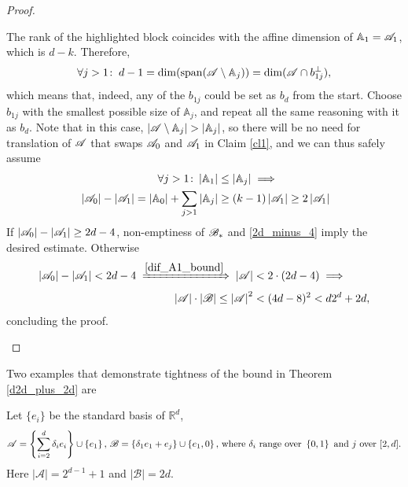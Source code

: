 \begin{proof}
\begin{enumerate}
            The rank of the highlighted block coincides with the affine dimension of $\mathbb{A}_1={\mathscr{A}}_1$, which is $d-k$. Therefore,
            \begin{equation*}
                \forall j>1\!:\;d-1=\operatorname{dim}(\operatorname{span}({\mathscr{A}}\setminus\mathbb{A}_j))=\operatorname{dim}({\mathscr{A}}\cap b_{1j}^\bot),
            \end{equation*}
            which means that, indeed, any of the $b_{1j}$ could be set as $b_d$ from the start. Choose $b_{1j}$ with the smallest possible size of $\mathbb{A}_j$, and repeat all the same reasoning with it as $b_d$. Note that in this case, $\left|\aaa\setminus\mathbb{A}_j\right|>\left|\mathbb{A}_j\right|$, so there will be no need for translation of ${\mathscr{A}}$ that swaps ${\mathscr{A}}_0$ and ${\mathscr{A}}_1$ in Claim \ref{cl1}, and we can thus safely assume
            \begin{align}
                \forall j>1\!:\:\left|\mathbb{A}_1\right| & \leq \left|\mathbb{A}_j\right|\; \Longrightarrow \nonumber\\
                 \;\left|{\mathscr{A}}_0\right|-\left|{\mathscr{A}}_1\right|=\left|\mathbb{A}_0\right|+\sum_{j>1}\left|\mathbb{A}_j\right| & \geq \left(k-1\right)\left|{\mathscr{A}}_1\right|\geq 2\left|{\mathscr{A}}_1\right|\label{dif_A1_bound}
            \end{align} 
            If $\left|{\mathscr{A}}_0\right|-\left|{\mathscr{A}}_1\right|\geq2d-4$, non-emptiness of ${\mathscr{B}}_*$ and \eqref{2d_minus_4} imply the desired estimate. Otherwise
            \begin{align*}
                \left|{\mathscr{A}}_0\right|-\left|{\mathscr{A}}_1\right|<2d-4 \;\xRightarrow{\eqref{dif_A1_bound}}\; \left|{\mathscr{A}}\right| &< 2\cdot(2d-4)\;\Longrightarrow \\ \left|{\mathscr{A}}\right|\cdot\left|{\mathscr{B}}\right|\leq\left|{\mathscr{A}}\right|^2 & < (4d-8)^2 < d 2^d + 2d,
            \end{align*}
            concluding the proof.
        \end{enumerate}
\end{proof}

\noindent Two examples that demonstrate tightness of the bound in Theorem \ref{d2d_plus_2d} are

\begin{example}\label{cubeOctop}
    Let $\{e_i\}$ be the standard basis of $\mathbb{R}^d$, 
    \begin{equation*}
        {\mathscr{A}}=\left\{\sum_{i=2}^{d}\delta_i e_i\right\}\cup\left\{e_1\right\}\text{, }{\mathscr{B}}=\left\{\delta_1 e_1 + e_j\right\} \cup \left\{e_1, 0\right\}\text{, where }\delta_i\text{ range over }\left\{0, 1\right\}\text{ and }j\text{ over }[2,d].
    \end{equation*}
    Here $\left|\mathcal{A}\right|=2^{d-1}+1$ and $\left|\mathcal{B}\right|=2d$.
\end{example}

